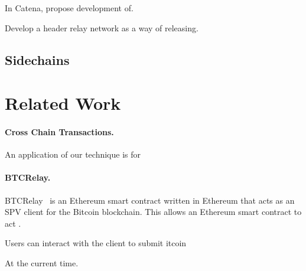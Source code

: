 In Catena, propose development of.

Develop a header relay network as a way of releasing.

\subsection{Sidechains}




\section{Related Work}

\paragraph{Cross Chain Transactions.}
An application of our technique is for 


\paragraph{BTCRelay.}
BTCRelay~\cite{btcrelay} is an Ethereum smart contract written in Ethereum that acts as an SPV client for the Bitcoin blockchain.
This allows an Ethereum smart contract to act .

Users can interact with the client to submit itcoin

At the current time.
